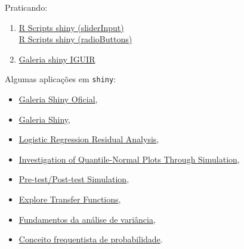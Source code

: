 \begin{frame}
 Praticando:
  
  \begin{enumerate}
    \itemsep1pt\parskip0pt
  \item
    \href{run:./R/shiny/shiny}{R Scripts shiny (sliderInput)}\\
    \href{run:./R/shiny/shiny2}{R Scripts shiny (radioButtons)}
  \item 
	\href{http://200.17.213.89:3838/iguir/list/}{Galeria shiny IGUIR}
  \end{enumerate}

  
  Algumas aplicações em \texttt{shiny}:
  \begin{itemize}
    \itemsep1pt\parskip0pt
  \item \href{http://shiny.rstudio.com/gallery/}{Galeria Shiny Oficial},
  \item \href{http://www.showmeshiny.com/}{Galeria Shiny},
  \item \href{http://www.stat.cmu.edu:3838/hseltman/LogReg/}{Logistic
      Regression Residual Analysis},
  \item
    \href{https://hseltman.shinyapps.io/QuantileNormal}{Investigation of
      Quantile-Normal Plots Through Simulation},
  \item
    \href{http://www.stat.cmu.edu:3838/hseltman/PrePost/}{Pre-test/Post-test
      Simulation},
  \item
    \href{http://www.stat.cmu.edu:3838/hseltman/TransferFunctions/}{Explore
      Transfer Functions},
  \item
    \href{http://nbcgib.uesc.br/lec/avale-es/amb-virtual/inferencia/anava}{Fundamentos
      da análise de variância},
  \item
    \href{http://nbcgib.uesc.br/lec/avale-es/amb-virtual/probabilidade/con-frequentista}{Conceito
      frequentista de probabilidade}.
  \end{itemize}

\end{frame}
